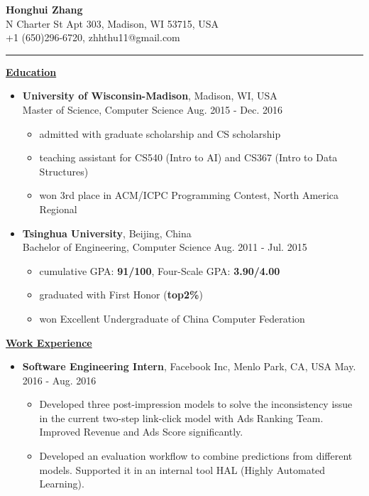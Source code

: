 \documentclass[11pt]{article}
\begin{document}
\begin{CJK}{GBK}{kai}
\begin{center}
  {\textbf{\huge Honghui Zhang}}\\ N Charter St Apt 303, Madison, WI 53715, USA\\
  +1 (650)296-6720, zhhthu11@gmail.com\\
\end{center}
\rule[4pt]{18.5cm}{0.5pt}
{ \textbf{\underline{Education}}}\\\medskip
\begin{itemize}
  \item \textbf{University of Wisconsin-Madison}, Madison, WI, USA\\
  Master of Science, Computer Science  \hfill Aug. 2015 - Dec. 2016\\
    \begin{itemize}
    \item admitted with graduate scholarship and CS scholarship
    \item teaching assistant for CS540 (Intro to AI) and CS367 (Intro to Data Structures)
    \item won 3rd place in ACM/ICPC Programming Contest, North America Regional\\\medskip
    \end{itemize}
 \item \textbf{Tsinghua University}, Beijing, China\\
 Bachelor of Engineering, Computer Science \hfill Aug. 2011 - Jul. 2015\\
    \begin{itemize}
    \item cumulative GPA: \textbf{91/100}, Four-Scale GPA: \textbf{3.90/4.00}
    \item graduated with First Honor (\textbf{top2\%})
    \item won Excellent Undergraduate of China Computer Federation
    \end{itemize}
\end{itemize}

\bigskip

{\textbf{\underline{Work Experience}}}\\\medskip

\begin{itemize}
   \item \textbf{Software Engineering Intern}, Facebook Inc, Menlo Park, CA, USA \hfill May. 2016 - Aug. 2016\\
     \begin{itemize}
     \item Developed three post-impression models to solve the inconsistency issue in the current two-step link-click model with Ads Ranking Team. Improved Revenue and Ads Score significantly. 
     \item Developed an evaluation workflow to combine predictions from different models. Supported it in an internal tool HAL (Highly Automated Learning).\\\medskip
     \end{itemize}


\end{itemize}
\end{CJK}
\end{document}
